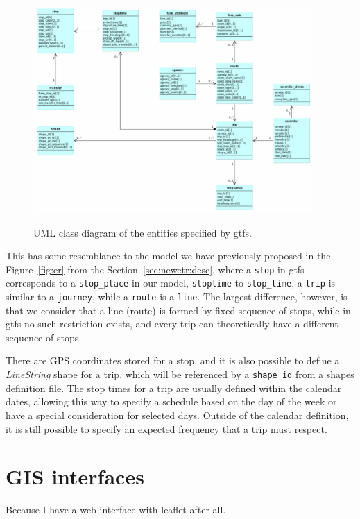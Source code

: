     \begin{figure}[ht]
		\begin{center}
			{\includegraphics[width=0.95\textwidth]{figures/gtfs.png}}
		\end{center}
		\caption{UML class diagram of the entities specified by \acrshort{gtfs}.}
		\label{fig:gis:gtfs}
	\end{figure}
	
	This has some resemblance to the model we have previously proposed in the Figure~\ref{fig:er} from the Section~\ref{sec:newctr:desc}, where a \texttt{stop} in \gls{gtfs} corresponds to a \texttt{stop\_place} in our model, \texttt{stoptime} to \texttt{stop\_time}, a \texttt{trip} is similar to a \texttt{journey}, while a \texttt{route} is a \texttt{line}. The largest difference, however, is that we consider that a line (route) is formed by fixed sequence of stops, while in \gls{gtfs} no such restriction exists, and every trip can theoretically have a different sequence of stops.
	
	There are GPS coordinates stored for a stop, and it is also possible to define a \textit{LineString} shape for a trip, which will be referenced by a \texttt{shape\_id} from a shapes definition file. The stop times for a trip are usually defined within the calendar dates, allowing this way to specify a schedule based on the day of the week or have a special consideration for selected days. Outside of the calendar definition, it is still possible to specify an expected frequency that a trip must respect.
    
    \section{GIS interfaces}
	Because I have a web interface with leaflet after all.

